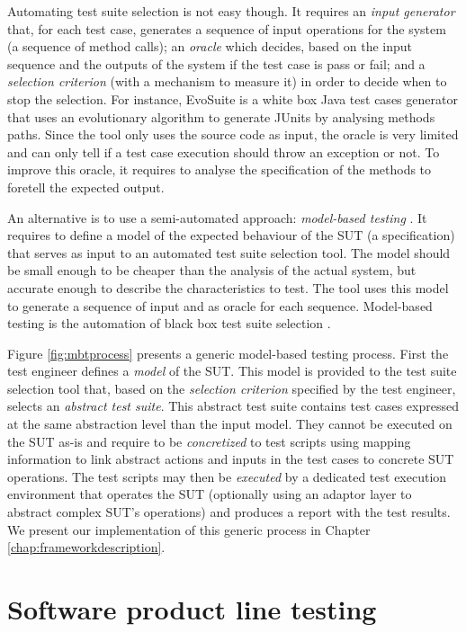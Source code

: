 Automating test suite selection is not easy though. It requires an \emph{input generator} that, for each test case, generates a sequence of input operations for the system (\eg a sequence of method calls); an \emph{oracle} which decides, based on the input sequence and the outputs of the system if the test case is pass or fail; and a \emph{selection criterion} (with a mechanism to measure it) in order to decide when to stop the selection. For instance, EvoSuite \cite{Fraser2011} is a white box Java test cases generator that uses an evolutionary algorithm to generate JUnits by analysing methods paths. Since the tool only uses the source code as input, the oracle is very limited and can only tell if a test case execution should throw an exception or not. To improve this oracle, it requires to analyse the specification of the methods to foretell the expected output.

An alternative is to use a semi-automated approach: \emph{model-based testing} \cite{Utting2007}. It requires to define a model of the expected behaviour of the SUT (\ie a specification) that serves as input to an automated test suite selection tool. The model should be small enough to be cheaper than the analysis of the actual system, but accurate enough to describe the characteristics to test. The tool uses this model to generate a sequence of input and as oracle for each sequence. Model-based testing is the automation of black box test suite selection \cite{Utting2007}.

Figure \ref{fig:mbtprocess} presents a generic model-based testing process. First the test engineer defines a \emph{model} of the SUT. This model is provided to the test suite selection tool that, based on the \emph{selection criterion} specified by the test engineer, selects an \emph{abstract test suite}. This abstract test suite contains test cases expressed at the same abstraction level than the input model. They cannot be executed on the SUT as-is and require to be \emph{concretized} to test scripts using mapping information to link abstract actions and inputs in the test cases to concrete SUT operations. The test scripts may then be \emph{executed} by a dedicated test execution environment that operates the SUT (optionally using an adaptor layer to abstract complex SUT's operations) and produces a report with the test results. We present our implementation of this generic process in Chapter \ref{chap:frameworkdescription}.


\section{Software product line testing}

